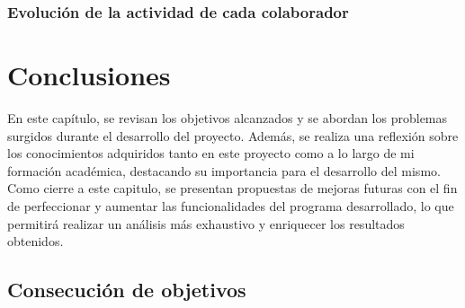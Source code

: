\documentclass[a4paper, 12pt]{book}
\begin{document}
\subsection{Evolución de la actividad de cada colaborador}
\label{subsec:actividad-colaborador}


\cleardoublepage
\chapter{Conclusiones}
\label{chap:conclusiones}

En este capítulo, se revisan los objetivos alcanzados y se abordan los problemas surgidos durante el desarrollo del proyecto. Además, se realiza una
reflexión sobre los conocimientos adquiridos tanto en este proyecto como a lo largo de mi formación académica, destacando su importancia para el
desarrollo del mismo. Como cierre a este capitulo, se presentan propuestas de mejoras futuras con el fin de perfeccionar y aumentar las funcionalidades
del programa desarrollado, lo que permitirá realizar un análisis más exhaustivo y enriquecer los resultados obtenidos.

\section{Consecución de objetivos}
\label{sec:consecucion-objetivos}
\end{document}
